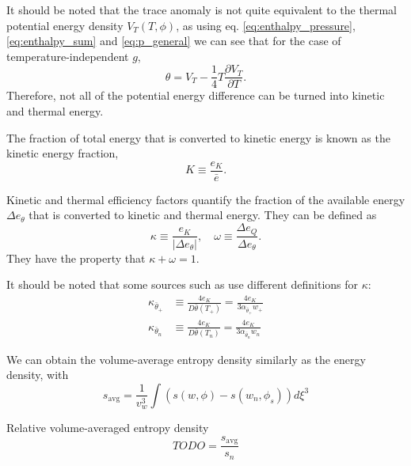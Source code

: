 It should be noted that the trace anomaly is not quite equivalent to the thermal potential energy density $V_T(T,\phi)$, as using eq. \eqref{eq:enthalpy_pressure}, \eqref{eq:enthalpy_sum} and \eqref{eq:p_general} we can see that for the case of temperature-independent $g$,
\begin{equation}
\theta = V_T - \frac{1}{4} T \frac{\partial V_T}{\partial T}.
\end{equation}
Therefore, not all of the potential energy difference can be turned into kinetic and thermal energy.
\cite[ch. B.2]{hindmarsh_gw_pt_2019}

The fraction of total energy that is converted to kinetic energy is known as the kinetic energy fraction,
\begin{equation}
K \equiv \frac{e_K}{\bar{e}}.
\end{equation}

Kinetic and thermal efficiency factors quantify the fraction of the available energy $\Delta e_\theta$ that is converted to kinetic and thermal energy.
They can be defined as
\begin{equation}
\kappa \equiv \frac{e_K}{| \Delta e_\theta |}, \quad
\omega \equiv \frac{\Delta e_Q}{\Delta e_\theta}.
\label{eq:kappa_omega}
\end{equation}
They have the property that $\kappa + \omega = 1$.

It should be noted that some sources such as \cites[eq. 36]{giese_2020}[eq. 12, 14]{giese_2021}
use different definitions for $\kappa$:
\begin{align}
\kappa_{\bar{\theta}_+} &\equiv \frac{4 e_K}{D \bar{\theta}(T_+)} = \frac{4 e_K}{3 \alpha_{\bar{\theta}_+} w_+} \\
\label{eq:kappa_thetabar_plus}
\kappa_{\bar{\theta}_n} &\equiv \frac{4 e_K}{D \bar{\theta}(T_n)} = \frac{4 e_K}{3 \alpha_{\bar{\theta}_n} w_n}
\label{eq:kappa_thetabar_n}
\end{align}

We can obtain the volume-average entropy density similarly as the energy density, with
\begin{equation}
s_\text{avg} = \frac{1}{v_w^3} \int \left( s(w,\phi) - s(w_n, \phi_s) \right) d\xi^3
\end{equation}

Relative volume-averaged entropy density
\begin{equation}
TODO = \frac{s_\text{avg}}{s_n}
\end{equation}

